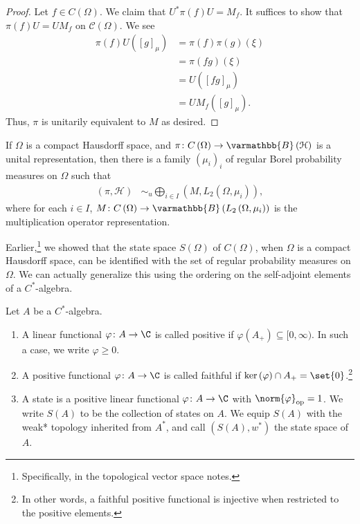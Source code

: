 \documentclass[10pt]{mypackage}
\renewcommand*{\mathbb}[1]{\varmathbb{#1}}
\newcommand{\B}{\mathbb{B}}
\DeclareMathOperator{\op}{op}
\begin{document}
\begin{proof}
  Let $f\in C\left(\Omega\right)$. We claim that $U^{\ast}\pi(f)U = M_f$. It suffices to show that $\pi(f)U = UM_f$ on $\mathcal{C}\left(\Omega\right)$. We see
  \begin{align*}
    \pi(f)U\left(\left[g\right]_{\mu}\right) &= \pi(f)\pi(g)\left(\xi\right)\\
                                             &= \pi\left(fg\right)\left(\xi\right)\\
                                             &= U\left(\left[fg\right]_{\mu}\right)\\
                                             &= U M_f\left(\left[g\right]_{\mu}\right).
  \end{align*}
  Thus, $\pi$ is unitarily equivalent to $M$ as desired.
\end{proof}
\begin{corollary}
  If $\Omega$ is a compact Hausdorff space, and $\pi\colon C\left(\Omega\right)\rightarrow \B\left(\mathcal{H}\right)$ is a unital representation, then there is a family $\left(\mu_i\right)_i$ of regular Borel probability measures on $\Omega$ such that
  \begin{align*}
    \left(\pi,\mathcal{H}\right) &\sim_{u} \bigoplus_{i\in I}\left(M,L_2\left(\Omega,\mu_i\right)\right),
  \end{align*}
  where for each $i\in I$, $M\colon C\left(\Omega\right)\rightarrow \B\left(L_2\left(\Omega,\mu_i\right)\right)$ is the multiplication operator representation.
\end{corollary}
Earlier,\footnote{Specifically, in the topological vector space notes.} we showed that the state space $S\left(\Omega\right)$ of $C\left(\Omega\right)$, when $\Omega$ is a compact Hausdorff space, can be identified with the set of regular probability measures on $\Omega$. We can actually generalize this using the ordering on the self-adjoint elements of a $C^{\ast}$-algebra.
\begin{definition}
  Let $A$ be a $C^{\ast}$-algebra.
  \begin{enumerate}[(1)]
    \item A linear functional $\varphi\colon A\rightarrow \C$ is called positive if $\varphi\left(A_{+}\right) \subseteq [0,\infty)$. In such a case, we write $\varphi \geq 0$.
    \item A positive functional $\varphi\colon A\rightarrow \C$ is called faithful if $\ker\left(\varphi\right)\cap A_{+} = \set{0}$.\footnote{In other words, a faithful positive functional is injective when restricted to the positive elements.}
    \item A state is a positive linear functional $\varphi\colon A\rightarrow \C$ with $\norm{\varphi}_{\op} = 1$. We write $S(A)$ to be the collection of states on $A$. We equip $S(A)$ with the weak* topology inherited from $A^{\ast}$, and call $\left(S(A),w^{\ast}\right)$ the state space of $A$.
  \end{enumerate}
\end{definition}
\end{document}

